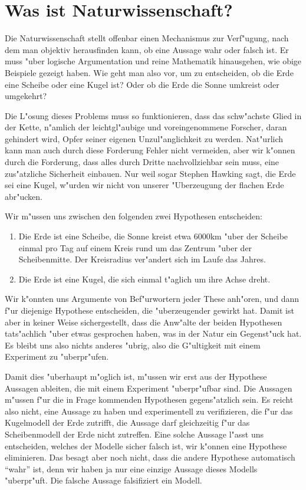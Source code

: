 \section*{Was ist Naturwissenschaft?}
Die Naturwissenschaft stellt offenbar einen Mechanismus zur Verf"ugung,
nach dem man objektiv herausfinden kann, ob eine Aussage wahr oder falsch ist.
Er muss "uber logische Argumentation und reine Mathematik hinausgehen,
wie obige Beispiele gezeigt haben.
Wie geht man also vor, um zu entscheiden, ob die Erde eine Scheibe
oder eine Kugel ist?
Oder ob die Erde die Sonne umkreist oder umgekehrt?

Die L"osung dieses Problems muss so funktionieren, dass das schw"achste
Glied in der Kette, n"amlich der leichtgl"aubige und voreingenommene
Forscher, daran gehindert wird, Opfer seiner eigenen Unzul"anglichkeit
zu werden.
Nat"urlich kann man auch durch diese Forderung Fehler nicht vermeiden,
aber wir k"onnen durch die Forderung, dass alles durch Dritte nachvollziehbar
sein muss, eine zus"atzliche Sicherheit einbauen.
Nur weil sogar Stephen Hawking sagt, die Erde sei eine Kugel, w"urden wir
nicht von unserer "Uberzeugung der flachen Erde abr"ucken.

Wir m"ussen uns zwischen den folgenden zwei Hypothesen entscheiden:
\begin{enumerate}
\item Die Erde ist eine Scheibe, die Sonne kreist etwa 6000km "uber der
Scheibe einmal pro Tag auf einem Kreis rund um das Zentrum "uber der
Scheibenmitte. 
Der Kreisradius ver"andert sich im Laufe das Jahres.
\item Die Erde ist eine Kugel, die sich einmal t"aglich um ihre
Achse dreht.
\end{enumerate}
Wir k"onnten uns Argumente von Bef"urwortern jeder These anh"oren,
und dann f"ur diejenige Hypothese entscheiden, die "uberzeugender
gewirkt hat. 
Damit ist aber in keiner Weise sichergestellt, dass die Anw"alte der
beiden Hypothesen tats"achlich "uber etwas gesprochen haben, was
in der Natur ein Gegenst"uck hat.
Es bleibt uns also nichts anderes "ubrig, also die G"ultigkeit mit
einem Experiment zu "uberpr"ufen.

Damit dies "uberhaupt m"oglich ist, m"ussen wir erst aus der Hypothese
Aussagen ableiten, die mit einem Experiment "uberpr"ufbar sind.
Die Aussagen m"ussen f"ur die in Frage kommenden Hypothesen gegens"atzlich
sein.
Es reicht also nicht, eine Aussage zu haben und experimentell zu
verifizieren, die f"ur das Kugelmodell der Erde zutrifft,
die Aussage darf gleichzeitig f"ur das Scheibenmodell der Erde
nicht zutreffen.
Eine solche Aussage l"asst uns entscheiden, welches der Modelle
sicher falsch ist, wir k"onnen eine Hypothese eliminieren.
Das besagt aber noch nicht, dass die andere Hypothese automatisch
``wahr'' ist, denn wir haben ja nur eine einzige Aussage dieses
Modells "uberpr"uft.
Die falsche Aussage falsifiziert ein Modell.

